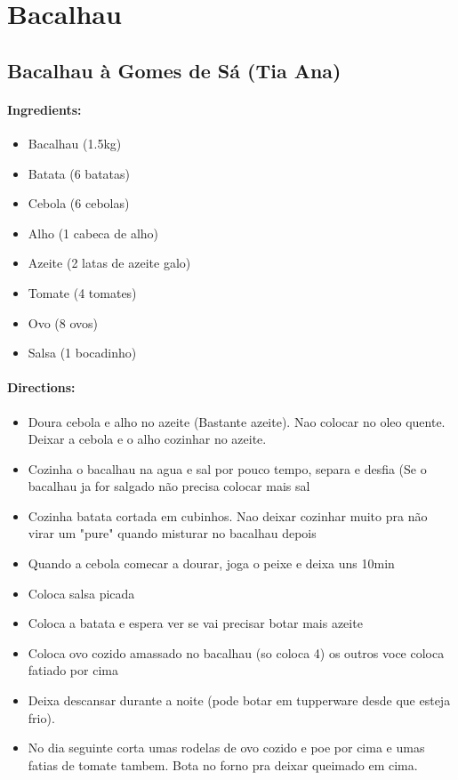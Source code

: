 \documentclass{article}
\begin{document}
\section{Bacalhau}


\subsection{Bacalhau à Gomes de Sá (Tia Ana)}

\paragraph{Ingredients:}
\begin{itemize}
    \item Bacalhau (1.5kg)
    \item Batata (6 batatas)
    \item Cebola (6 cebolas)
    \item Alho (1 cabeca de alho)
    \item Azeite (2 latas de azeite galo)
    \item Tomate (4 tomates)
    \item Ovo (8 ovos)
    \item Salsa (1 bocadinho)
\end{itemize}

\paragraph{Directions:}
\begin{itemize}
    \item Doura cebola e alho no azeite (Bastante azeite). Nao colocar no oleo quente. Deixar a cebola e o alho cozinhar no azeite.
    \item Cozinha o bacalhau na agua e sal por pouco tempo, separa e desfia (Se o bacalhau ja for salgado não precisa colocar mais sal
    \item Cozinha batata cortada em cubinhos. Nao deixar cozinhar muito pra não virar um "pure" quando misturar no bacalhau depois
    \item Quando a cebola comecar a dourar, joga o peixe e deixa uns 10min
    \item Coloca salsa picada
    \item Coloca a batata e espera ver se vai precisar botar mais azeite
    \item Coloca ovo cozido amassado no bacalhau (so coloca 4) os outros voce coloca fatiado por cima
    \item Deixa descansar durante a noite (pode botar em tupperware desde que esteja frio).
    \item No dia seguinte corta umas rodelas de ovo cozido e poe por cima e umas fatias de tomate tambem. Bota no forno pra deixar  queimado em cima.
\end{itemize}
\end{document}
